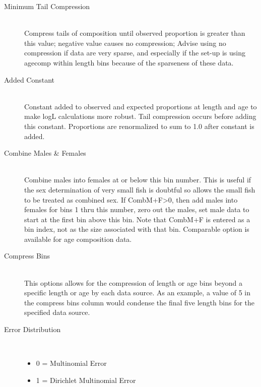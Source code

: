\begin{description}
	\item[Minimum Tail Compression]\hfill\\
	Compress tails of composition until observed proportion is greater than this value; negative value causes no compression; Advise using no compression if data are very sparse, and especially if the set-up is using agecomp within length bins because of the sparseness of these data.

	\item[Added Constant]\hfill\\
	Constant added to observed and expected proportions at length and age to make logL calculations more robust.  Tail compression occurs before adding this constant.  Proportions are renormalized to sum to 1.0 after constant is added.

	\item[Combine Males \& Females]\hfill\\
	Combine males into females at or below this bin number.  This is useful if the sex determination of very small fish is doubtful so allows the small fish to be treated as combined sex.  If CombM+F>0, then add males into females for bins 1 thru this number, zero out the males, set male data to start at the first bin above this bin.  Note that CombM+F is entered as a bin index, not as the size associated with that bin.  Comparable option is available for age composition data.

	\item[Compress Bins]\hfill\\
	This options allows for the compression of length or age bins beyond a specific length or age by each data source.  As an example,  a value of 5 in the compress bins column would condense the final five length bins for the specified data source.
	\item[Error Distribution]\
	\begin{itemize}
		\item 0 = Multinomial Error
		\item 1 = Dirichlet Multinomial Error
	\end{itemize}


\end{description}
